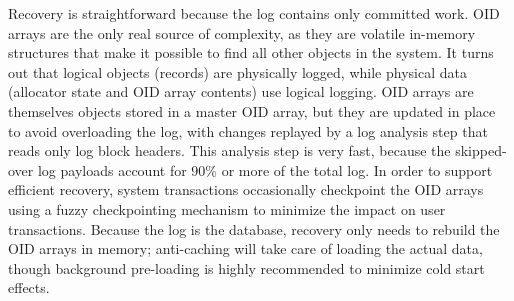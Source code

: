 Recovery is straightforward because the log contains only committed work. OID arrays are the only real source of complexity, as they are volatile in-memory structures that make it possible to find all other objects in the system. It turns out that logical objects (records) are physically logged, while physical data (allocator state and OID array contents) use logical logging.  OID arrays are themselves objects stored in a master OID array, but they are updated in place to avoid overloading the log, with changes replayed by a log analysis step that reads only log block headers. This analysis step is very fast, because the skipped-over log payloads account for 90\% or more of the total log. In order to support efficient recovery, system transactions occasionally checkpoint the OID arrays using a fuzzy checkpointing mechanism to minimize the impact on user transactions. Because the log is the database, recovery only needs to rebuild the OID arrays in memory; anti-caching will take care of loading the actual data, though background pre-loading is highly recommended to minimize cold start effects.
